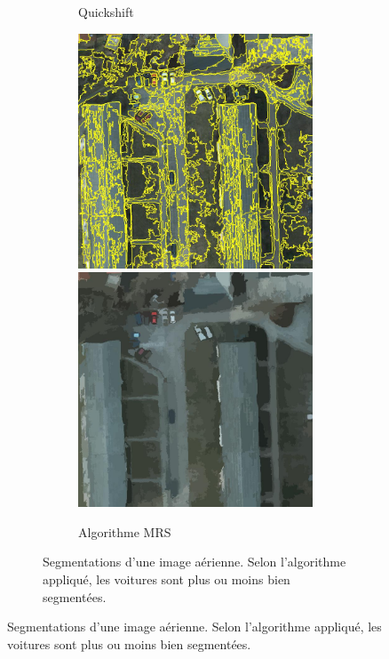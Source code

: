 \begin{figure}
\begin{subfigure}{\textwidth}
\begin{subfigure}{0.25\textwidth}
    \caption*{Quickshift}
\end{subfigure}%
\begin{subfigure}{0.25\textwidth}
    \includegraphics[width=\textwidth]{Chapitre2/potsdam_ecognition}
    \includegraphics[width=\textwidth]{Chapitre2/potsdam_ecognition_patchwork}
    \caption*{Algorithme MRS}
\end{subfigure}
\caption{Segmentations d'une image aérienne. Selon l'algorithme appliqué, les voitures sont plus ou moins bien segmentées.}
\label{fig:potsdam_segmentation}
\end{subfigure}


\end{figure}
